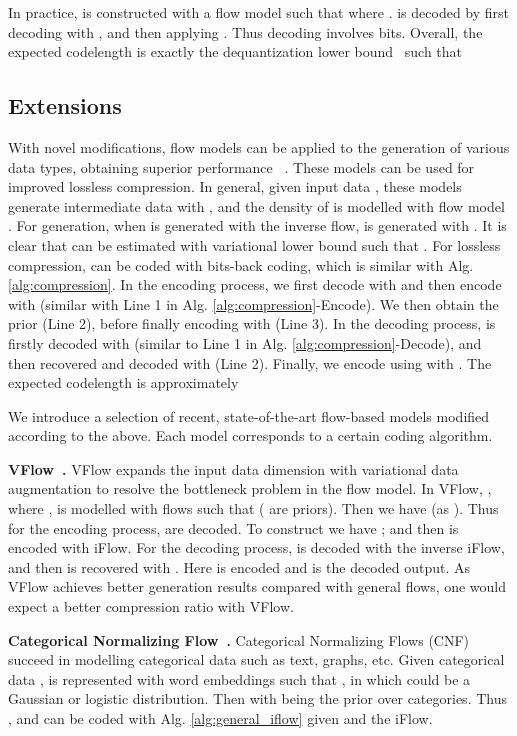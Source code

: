 \documentclass{article}
\begin{document}
In practice,  is constructed with a flow model such that  where .  is decoded by first decoding  with , and then applying . Thus decoding  involves  bits.
Overall, the expected codelength is exactly the dequantization lower bound~\cite{hoogeboom2020learning} such that


\subsection{Extensions}
\label{sec:iflow_extension}

With novel modifications, flow models can be applied to the generation of various data types, obtaining superior performance ~\cite{chen2020vflow,lippe2020categorical,kim2020softflow}. These models can be used for improved lossless compression. In general, given input data , these models generate intermediate data  with , and the density of  is modelled with flow model . For generation, when  is generated with the inverse flow,  is generated with . It is clear that  can be estimated with variational lower bound such that . For lossless compression,  can be coded with bits-back coding, which is similar with Alg. \ref{alg:compression}. In the encoding process, we first decode  with  and then encode  with  (similar with Line 1 in Alg. \ref{alg:compression}-Encode). We then obtain the prior  (Line 2), before finally encoding  with  (Line 3). In the decoding process,  is firstly decoded with  (similar to Line 1 in Alg. \ref{alg:compression}-Decode), and then recovered  and decoded  with  (Line 2). Finally, we encode using  with  \cite{townsend2019practical}. The expected codelength is approximately


We introduce a selection of recent, state-of-the-art flow-based models modified according to the above. Each model corresponds to a certain coding algorithm.

\textbf{VFlow~\cite{chen2020vflow}.} VFlow expands the input data dimension with variational data augmentation to resolve the bottleneck problem in the flow model. In VFlow, , where , is modelled with flows  such that  ( are priors). Then we have  (as ). Thus for the encoding process,  are decoded. To construct  we have ; and then  is encoded with iFlow. For the decoding process,  is decoded with the inverse iFlow, and then  is recovered with . Here  is encoded and  is the decoded output. As VFlow achieves better generation results compared with general flows, one would expect a better compression ratio with VFlow.

\textbf{Categorical Normalizing Flow~\cite{lippe2020categorical}.} Categorical Normalizing Flows (CNF) succeed in modelling categorical data such as text, graphs, etc. Given categorical data ,  is represented with word embeddings such that , in which  could be a Gaussian or logistic distribution. Then  with  being the prior over categories. Thus , and  can be coded with Alg. \ref{alg:general_iflow} given  and the iFlow.
\end{document}
